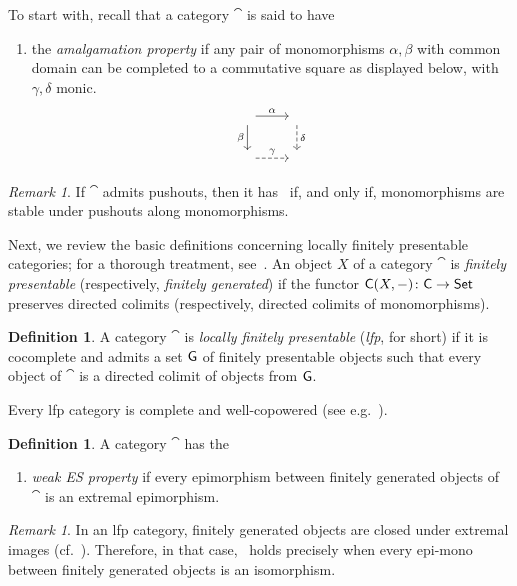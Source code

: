 \documentclass[a4paper,10pt,reqno]{amsart}
\theoremstyle{definition}
\newtheorem{definition}[theorem]{Definition}
\theoremstyle{remark}
\newtheorem{remark}[theorem]{Remark}
\begin{document}
To start with, recall that a category $\cat$ is said to have
\begin{enumerate}
\item[(AP)]\label{AP} the \emph{amalgamation property} if any pair of monomorphisms $\alpha,\beta$ with common domain can be completed to a commutative square as displayed below, with $\gamma, \delta$ monic.
\[\begin{tikzcd}
\phantom{\cdot} \arrow{r}{\alpha} \arrow{d}[swap]{\beta} & \phantom{\cdot} \arrow[dashed]{d}{\delta} \\
\phantom{\cdot} \arrow[dashed]{r}{\gamma} & \phantom{\cdot}
\end{tikzcd}\]
\end{enumerate}


\begin{remark}
If $\cat$ admits pushouts, then it has \AP~if, and only if, monomorphisms are stable under pushouts along monomorphisms. 
\end{remark}

Next, we review the basic definitions concerning locally finitely presentable categories; for a thorough treatment, see~\cite{ar94book}. An object $X$ of a category $\cat$ is \emph{finitely presentable} (respectively, \emph{finitely generated}) if the functor ${\sf C}(X,-)\colon {\sf C}\to{\sf Set}$ preserves directed colimits (respectively, directed colimits of monomorphisms).
%
\begin{definition}
A category $\cat$ is \emph{locally finitely presentable} (\emph{lfp}, for short) if it is cocomplete and admits a set $\sf G$ of finitely presentable objects such that every object of $\cat$ is a directed colimit of objects from $\sf G$.
\end{definition}

Every lfp category is complete and well-copowered (see e.g.\ \cite[Corollary~1.28 and Theorem~1.58]{ar94book}).

%
\begin{definition}\label{d:WES}
A category $\cat$ has the
\begin{enumerate}
\item[(\WES)]\label{WES} \emph{weak ES property} if every epimorphism between finitely generated objects of $\cat$ is an extremal epimorphism.
\end{enumerate}
\end{definition}

\begin{remark}\label{rm:WES-in-lfp}
In an lfp category, finitely generated objects are closed under extremal images (cf.\ \cite[Proposition~1.69]{ar94book}). Therefore, in that case, \WES~holds precisely when every epi-mono between finitely generated objects is an isomorphism.
\end{remark}
\end{document}
